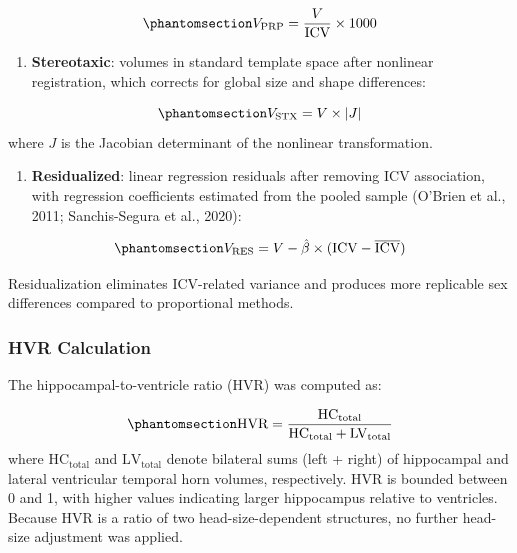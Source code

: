 \documentclass[
]{article}
\providecommand{\tightlist}{%
  \setlength{\itemsep}{0pt}\setlength{\parskip}{0pt}}
\begin{document}
\begin{equation}\phantomsection\label{eq-prp}{V_{\text{PRP}} = \frac{V}{\text{ICV}} \times 1000}\end{equation}

\begin{enumerate}
\def\labelenumi{\arabic{enumi}.}
\setcounter{enumi}{2}
\tightlist
\item
  \textbf{Stereotaxic}: volumes in standard template space after
  nonlinear registration, which corrects for global size and shape
  differences:
\end{enumerate}

\begin{equation}\phantomsection\label{eq-stx}{V_{\text{STX}} = V \times |J|}\end{equation}
where \(J\) is the Jacobian determinant of the nonlinear transformation.

\begin{enumerate}
\def\labelenumi{\arabic{enumi}.}
\setcounter{enumi}{3}
\tightlist
\item
  \textbf{Residualized}: linear regression residuals after removing ICV
  association, with regression coefficients estimated from the pooled
  sample (O'Brien et al., 2011; Sanchis-Segura et al., 2020):
\end{enumerate}

\begin{equation}\phantomsection\label{eq-res}{V_{\text{RES}} = V - \hat{\beta} \times (\text{ICV} - \overline{\text{ICV}})}\end{equation}

Residualization eliminates ICV-related variance and produces more
replicable sex differences compared to proportional methods.

\subsubsection{HVR Calculation}\label{hvr-calculation}

The hippocampal-to-ventricle ratio (HVR) was computed as:

\begin{equation}\phantomsection\label{eq-hvr}{\text{HVR} = \frac{\text{HC}_{\text{total}}}{\text{HC}_{\text{total}} + \text{LV}_{\text{total}}}}\end{equation}
where \(\text{HC}_{\text{total}}\) and \(\text{LV}_{\text{total}}\)
denote bilateral sums (left + right) of hippocampal and lateral
ventricular temporal horn volumes, respectively. HVR is bounded between
0 and 1, with higher values indicating larger hippocampus relative to
ventricles. Because HVR is a ratio of two head-size-dependent
structures, no further head-size adjustment was applied.
\end{document}
